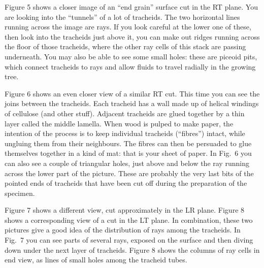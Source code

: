 

  Figure 5 shows a closer image of an “end grain” surface cut in the RT plane. 
  You are looking into the “tunnels” of a lot of tracheids. The two horizontal 
  lines running across the image are rays. If you look careful at the lower one 
  of these, then look into the tracheids just above it, you can make out ridges 
  running across the floor of those tracheids, where the other ray cells of 
  this stack are passing underneath. You may also be able to see some small 
  holes: these are piceoid pits, which connect tracheids to rays and allow 
  fluids to travel radially in the growing tree. 


  Figure 6 shows an even closer view of a similar RT cut. This time you can see 
  the joins between the tracheids. Each tracheid has a wall made up of helical 
  windings of cellulose (and other stuff). Adjacent tracheids are glued 
  together by a thin layer called the middle lamella. When wood is pulped to 
  make paper, the intention of the process is to keep individual tracheids 
  (“fibres”) intact, while ungluing them from their neighbours. The fibres can 
  then be persuaded to glue themselves together in a kind of mat: that is your 
  sheet of paper. In Fig.\ 6 you can also see a couple of triangular holes, 
  just above and below the ray running across the lower part of the picture. 
  These are probably the very last bits of the pointed ends of tracheids that 
  have been cut off during the preparation of the specimen. 


  Figure 7 shows a different view, cut approximately in the LR plane. Figure 8 
  shows a corresponding view of a cut in the LT plane. In combination, these 
  two pictures give a good idea of the distribution of rays among the 
  tracheids. In Fig.\ 7 you can see parts of several rays, exposed on the 
  surface and then diving down under the next layer of tracheids. Figure 8 
  shows the columns of ray cells in end view, as lines of small holes among the 
  tracheid tubes. 

